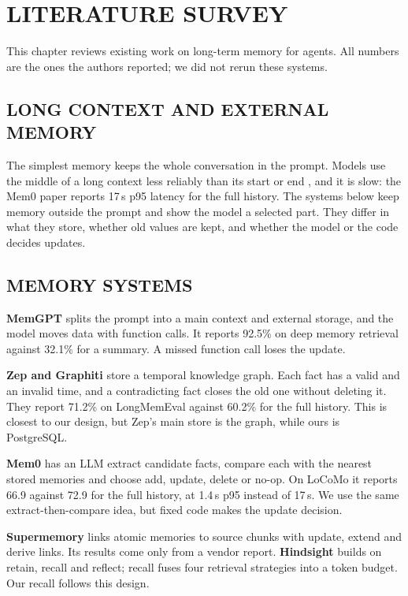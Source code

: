 
\chapter{\uppercase{Literature Survey}}
\label{ch:survey}
This chapter reviews existing work on long-term memory for agents. All numbers are the ones the
authors reported; we did not rerun these systems.

\section{\uppercase{Long Context and External Memory}}
The simplest memory keeps the whole conversation in the prompt. Models use the middle of a long
context less reliably than its start or end \cite{liu2024lost}, and it is slow: the Mem0 paper
reports 17\,s p95 latency for the full history. The systems below keep memory outside the prompt
and show the model a selected part. They differ in what they store, whether old values are kept,
and whether the model or the code decides updates.

\section{\uppercase{Memory Systems}}
\textbf{MemGPT} \cite{packer2023memgpt} splits the prompt into a main context and external
storage, and the model moves data with function calls. It reports 92.5\% on deep memory
retrieval against 32.1\% for a summary. A missed function call loses the update.

\textbf{Zep and Graphiti} \cite{rasmussen2025zep} store a temporal knowledge graph. Each fact
has a valid and an invalid time, and a contradicting fact closes the old one without deleting
it. They report 71.2\% on LongMemEval against 60.2\% for the full history. This is closest to
our design, but Zep's main store is the graph, while ours is PostgreSQL.

\textbf{Mem0} \cite{chhikara2025mem0} has an LLM extract candidate facts, compare each with the
nearest stored memories and choose add, update, delete or no-op. On LoCoMo it reports 66.9
against 72.9 for the full history, at 1.4\,s p95 instead of 17\,s. We use the same
extract-then-compare idea, but fixed code makes the update decision.

\textbf{Supermemory} \cite{daga2026supermemory} links atomic memories to source chunks with
update, extend and derive links. Its results come only from a vendor report.
\textbf{Hindsight} \cite{latimer2025hindsight} builds on retain, recall and reflect; recall fuses
four retrieval strategies into a token budget. Our recall follows this design.

